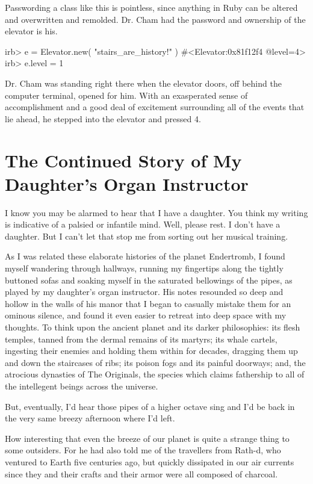\documentclass[12pt,twoside]{report}
\begin{document}
Passwording a class like this is pointless, since anything in Ruby can
be altered and overwritten and remolded.  Dr. Cham had the password
and ownership of the elevator is his.


\begin{consolecode}

 irb> e = Elevator.new( "stairs_are_history!" )
 #<Elevator:0x81f12f4 @level=4>
 irb> e.level = 1

\end{consolecode}


Dr. Cham was standing right there when the elevator doors, off behind
the computer terminal, opened for him.  With an exasperated sense of
accomplishment and a good deal of excitement surrounding all of the
events that lie ahead, he stepped into the elevator and pressed 4.

\newpage


\section{The Continued Story of My Daughter's Organ \mbox{Instructor}}


I know you may be alarmed to hear that I have a daughter.  You think
my writing is indicative of a palsied or infantile mind.  Well, please
rest.  I don't have a daughter. But I can't let that stop me from
sorting out her musical training.

As I was related these elaborate histories of the planet Endertromb, I
found myself wandering through hallways, running my fingertips along
the tightly buttoned sofas and soaking myself in the saturated
bellowings of the pipes, as played by my daughter's organ instructor.
His notes resounded so deep and hollow in the walls of his manor that
I began to casually mistake them for an ominous silence, and found it
even easier to retreat into deep space with my thoughts.  To think
upon the ancient planet and its darker philosophies: its flesh
temples, tanned from the dermal remains of its martyrs; its whale
cartels, ingesting their enemies and holding them within for decades,
dragging them up and down the staircases of ribs; its poison fogs and
its painful doorways; and, the atrocious dynasties of The Originals,
the species which claims fathership to all of the intellegent beings
across the universe.

But, eventually, I'd hear those pipes of a higher octave sing and I'd
be back in the very same breezy afternoon where I'd left.

How interesting that even the breeze of our planet is quite a strange
thing to some outsiders.  For he had also told me of the travellers
from Rath-d, who ventured to Earth five centuries ago, but quickly
dissipated in our air currents since they and their crafts and their
armor were all composed of charcoal.
\end{document}

